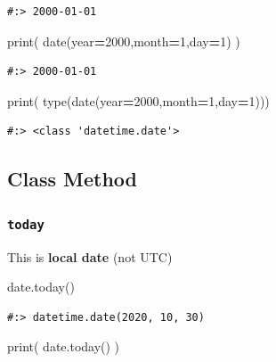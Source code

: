 \documentclass[
]{book}
\newenvironment{Shaded}{\begin{snugshade}}{\end{snugshade}}
\newcommand{\BuiltInTok}[1]{#1}
\newcommand{\DecValTok}[1]{\textcolor[rgb]{0.06,0.06,0.06}{#1}}
\newcommand{\NormalTok}[1]{#1}
\newcommand{\OperatorTok}[1]{\textcolor[rgb]{0.43,0.43,0.43}{\textbf{#1}}}
\begin{document}
\begin{verbatim}
#:> 2000-01-01
\end{verbatim}

\begin{Shaded}
\begin{Highlighting}[]
\BuiltInTok{print}\NormalTok{( date(year}\OperatorTok{=}\DecValTok{2000}\NormalTok{,month}\OperatorTok{=}\DecValTok{1}\NormalTok{,day}\OperatorTok{=}\DecValTok{1}\NormalTok{) )}
\end{Highlighting}
\end{Shaded}

\begin{verbatim}
#:> 2000-01-01
\end{verbatim}

\begin{Shaded}
\begin{Highlighting}[]
\BuiltInTok{print}\NormalTok{( }\BuiltInTok{type}\NormalTok{(date(year}\OperatorTok{=}\DecValTok{2000}\NormalTok{,month}\OperatorTok{=}\DecValTok{1}\NormalTok{,day}\OperatorTok{=}\DecValTok{1}\NormalTok{)))}
\end{Highlighting}
\end{Shaded}

\begin{verbatim}
#:> <class 'datetime.date'>
\end{verbatim}

\hypertarget{class-method}{%
\subsection{Class Method}\label{class-method}}

\hypertarget{today}{%
\subsubsection{\texorpdfstring{\texttt{today}}{today}}\label{today}}

This is \textbf{local date} (not UTC)

\begin{Shaded}
\begin{Highlighting}[]
\NormalTok{date.today()}
\end{Highlighting}
\end{Shaded}

\begin{verbatim}
#:> datetime.date(2020, 10, 30)
\end{verbatim}

\begin{Shaded}
\begin{Highlighting}[]
\BuiltInTok{print}\NormalTok{( date.today() )}
\end{Highlighting}
\end{Shaded}
\end{document}
